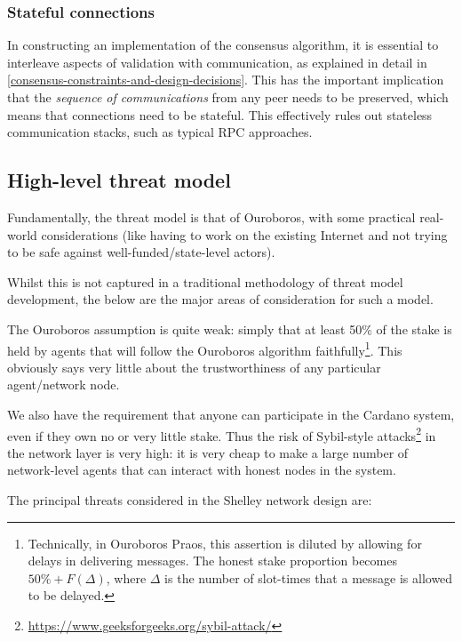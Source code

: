 \documentclass[11pt,a4paper]{article}
\begin{document}
\subsubsection{Stateful connections}
\label{stateful-connections}

In constructing an implementation of the consensus algorithm, it is
essential to interleave aspects of validation with communication, as
explained in detail in
\cref{consensus-constraints-and-design-decisions}. This has the important implication that the \emph{sequence of
communications} from any peer needs to be preserved, which means that
connections need to be stateful. This effectively rules out stateless
communication stacks, such as typical RPC approaches.

\subsection{High-level threat model}
\label{high-level-threat-model}

Fundamentally, the threat model is that of Ouroboros, with some
practical real-world considerations (like having to work on the existing
Internet and not trying to be safe against well-funded/state-level
actors).

Whilst this is not captured in a traditional methodology of threat model
development, the below are the major areas of consideration for such a
model.

The Ouroboros assumption is quite weak: simply that at least 50\% of the
stake is held by agents that will follow the Ouroboros algorithm
faithfully\footnote{Technically, in Ouroboros Praos, this assertion is
  diluted by allowing for delays in delivering messages. The honest
  stake proportion becomes $50\% + F(\Delta)$, where $\Delta$ is the number of
  slot-times that a message is allowed to be delayed.}. This obviously
says very little about the trustworthiness of any particular
agent/network node.

We also have the requirement that anyone can participate in the Cardano
system, even if they own no or very little stake. Thus the risk of
Sybil-style attacks\footnote{\href{https://www.geeksforgeeks.org/sybil-attack/}{{https://www.geeksforgeeks.org/sybil-attack/}}}
in the network layer is very high: it is very cheap to make a large
number of network-level agents that can interact with honest nodes in
the system.

The principal threats considered in the Shelley network design are:
\end{document}
